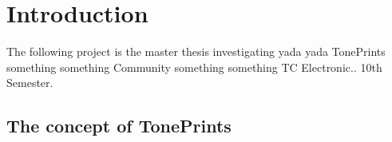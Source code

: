 \chapter{Introduction}
\label{Introduction}
The following project is the master thesis investigating yada yada TonePrints something something Community something something TC Electronic.. 10th Semester.

\section{The concept of TonePrints}
\label{TonePrints}


